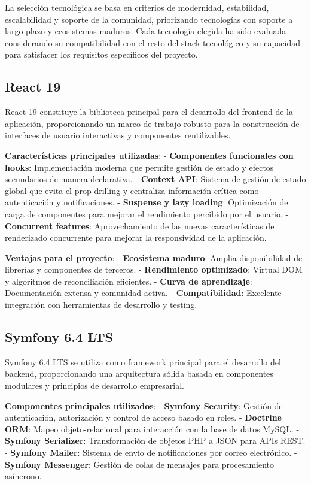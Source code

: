 \documentclass[12pt,a4paper,oneside]{report}
\begin{document}
La selección tecnológica se basa en criterios de modernidad,
estabilidad, escalabilidad y soporte de la comunidad, priorizando
tecnologías con soporte a largo plazo y ecosistemas maduros. Cada
tecnología elegida ha sido evaluada considerando su compatibilidad con
el resto del stack tecnológico y su capacidad para satisfacer los
requisitos específicos del proyecto.

\subsection{React 19}\label{react-19}

React 19 constituye la biblioteca principal para el desarrollo del
frontend de la aplicación, proporcionando un marco de trabajo robusto
para la construcción de interfaces de usuario interactivas y componentes
reutilizables.

\textbf{Características principales utilizadas}: - \textbf{Componentes
funcionales con hooks}: Implementación moderna que permite gestión de
estado y efectos secundarios de manera declarativa. - \textbf{Context
API}: Sistema de gestión de estado global que evita el prop drilling y
centraliza información crítica como autenticación y notificaciones. -
\textbf{Suspense y lazy loading}: Optimización de carga de componentes
para mejorar el rendimiento percibido por el usuario. -
\textbf{Concurrent features}: Aprovechamiento de las nuevas
características de renderizado concurrente para mejorar la responsividad
de la aplicación.

\textbf{Ventajas para el proyecto}: - \textbf{Ecosistema maduro}: Amplia
disponibilidad de librerías y componentes de terceros. -
\textbf{Rendimiento optimizado}: Virtual DOM y algoritmos de
reconciliación eficientes. - \textbf{Curva de aprendizaje}:
Documentación extensa y comunidad activa. - \textbf{Compatibilidad}:
Excelente integración con herramientas de desarrollo y testing.

\subsection{Symfony 6.4 LTS}\label{symfony-6.4-lts}

Symfony 6.4 LTS se utiliza como framework principal para el desarrollo
del backend, proporcionando una arquitectura sólida basada en
componentes modulares y principios de desarrollo empresarial.

\textbf{Componentes principales utilizados}: - \textbf{Symfony
Security}: Gestión de autenticación, autorización y control de acceso
basado en roles. - \textbf{Doctrine ORM}: Mapeo objeto-relacional para
interacción con la base de datos MySQL. - \textbf{Symfony Serializer}:
Transformación de objetos PHP a JSON para APIs REST. - \textbf{Symfony
Mailer}: Sistema de envío de notificaciones por correo electrónico. -
\textbf{Symfony Messenger}: Gestión de colas de mensajes para
procesamiento asíncrono.
\end{document}
